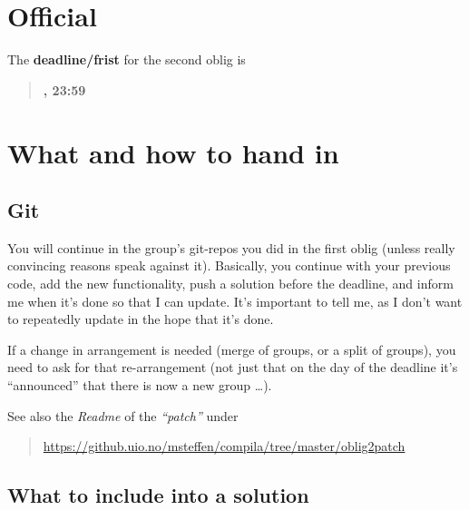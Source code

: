 \documentclass[11pt,freeform]{handout}[2014/08/13]
\begin{document}
\thispagestyle{empty}



\section{Official }
\label{sec:official-info}




\hrulefill{}

The \textbf{deadline/frist}  for the second oblig is

\begin{quote}
  \textbf{\deadlinetwo, 23:59}
\end{quote}





\section{What and how to hand in}
\label{sec:what-how}


\subsection{Git}
\label{sec:git}

You will continue in the group's git-repos you did in the first oblig
(unless really convincing reasons speak against it).  Basically, you
continue with your previous code, add the new functionality, push a
solution before the deadline, and inform me when it's done so that I can
update. It's important to tell me, as I don't want to repeatedly update in
the hope that it's done.


If a change in arrangement is needed (merge of groups, or a split of
groups), you need to ask for that re-arrangement (not just that on the day
of the deadline it's ``announced'' that there is now a new group \ldots).



See also the \emph{Readme} of the \emph{``patch''} under

\begin{quote}
  \url{https://github.uio.no/msteffen/compila/tree/master/oblig2patch}
\end{quote}


\subsection{What to include into a solution}
\label{sec:what-include-into}
\end{document}
